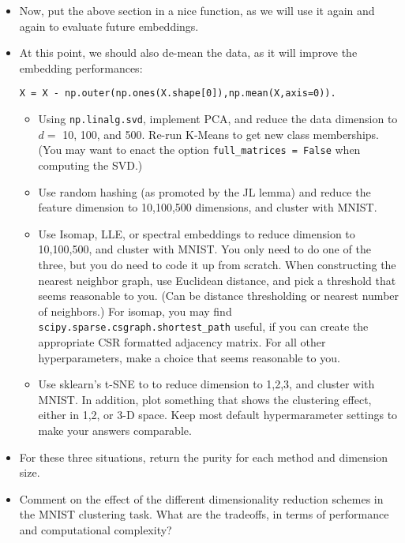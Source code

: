 \documentclass{article}
\begin{document}
\begin{enumerate}
\begin{itemize}
\item Now, put the above section in a nice function, as we will use it again and again to evaluate future embeddings. 

\item At this point, we should also  de-mean the data, as it will improve the embedding performances:
\begin{verbatim}
X = X - np.outer(np.ones(X.shape[0]),np.mean(X,axis=0)).
\end{verbatim}


\begin{itemize}
\item Using \texttt{np.linalg.svd}, implement PCA, and reduce the data dimension to $d = $ 10, 100, and 500.  Re-run K-Means to get new class memberships.
(You may want to enact the option \texttt{full\_matrices = False} when computing the SVD.)




\item Use random hashing (as promoted by the JL lemma) and reduce the feature dimension to 10,100,500 dimensions, and cluster with MNIST. 






\item Use Isomap, LLE, or spectral embeddings to reduce dimension to 10,100,500, and cluster with MNIST. You only need to do one of the three, but you do need to code it up from scratch. When constructing the nearest neighbor graph, use Euclidean distance, and pick a threshold that seems reasonable to you. (Can be distance thresholding or nearest number of neighbors.) For isomap, you may find \texttt{scipy.sparse.csgraph.shortest\_path} useful, if you can create the appropriate CSR formatted adjacency matrix. For all other hyperparameters, make a choice that seems reasonable to you.




\item Use sklearn's t-SNE to  to reduce dimension to 1,2,3, and cluster with MNIST. In addition, plot something that shows the clustering effect, either in 1,2, or 3-D space. Keep most default hypermarameter settings to make your answers comparable.

\end{itemize}

\item For these three situations,  return the purity for each method and dimension size. 

\item Comment on the effect of the different dimensionality reduction schemes in the MNIST clustering task. What are the tradeoffs, in terms of performance and computational complexity?



\end{itemize}
\end{enumerate}
\end{document}
